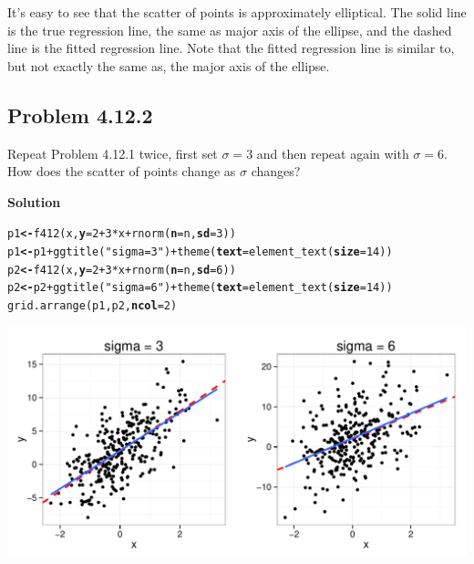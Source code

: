 \documentclass[12pt,oneside,a4paper]{article}\usepackage[]{graphicx}\usepackage[]{xcolor}
\makeatletter
\newcommand{\hlnum}[1]{\textcolor[rgb]{0,0,0}{#1}}%
\newcommand{\hlstr}[1]{\textcolor[rgb]{0,0,1}{#1}}%
\newcommand{\hlopt}[1]{\textcolor[rgb]{0,0,0}{#1}}%
\newcommand{\hlstd}[1]{\textcolor[rgb]{0,0,0}{#1}}%
\newcommand{\hlkwb}[1]{\textcolor[rgb]{0.498,0,0.333}{\textbf{#1}}}%
\newcommand{\hlkwc}[1]{\textcolor[rgb]{0.498,0,0.333}{\textbf{#1}}}%
\newcommand{\hlkwd}[1]{\textcolor[rgb]{0,0,0}{#1}}%
\newenvironment{kframe}{%
 \def\at@end@of@kframe{}%
 \ifinner\ifhmode%
  \def\at@end@of@kframe{\end{minipage}}%
  \begin{minipage}{\columnwidth}%
 \fi\fi%
 \def\FrameCommand##1{\hskip\@totalleftmargin \hskip-\fboxsep
 \colorbox{shadecolor}{##1}\hskip-\fboxsep
     \hskip-\linewidth \hskip-\@totalleftmargin \hskip\columnwidth}%
 \MakeFramed {\advance\hsize-\width
   \@totalleftmargin\z@ \linewidth\hsize
   \@setminipage}}%
 {\par\unskip\endMakeFramed%
 \at@end@of@kframe}
\newenvironment{knitrout}{}{} %
\newcommand{\subproblem}[1]
{
    \subsection*{Problem {#1}}
}
\newcommand{\solution}
{
    \vspace{15pt}
    \noindent\ignorespaces\textbf{\large Solution}
}
\makeatother
\begin{document}
It's easy to see that the scatter of points is approximately elliptical. The solid line is the true regression line, the same as major axis of the ellipse, and the dashed line is the fitted regression line. Note that the fitted regression line is similar to, but not exactly the same as, the major axis of the ellipse.

\subproblem{4.12.2}
Repeat Problem 4.12.1 twice, first set $\sigma = 3$ and then repeat again with $\sigma = 6$. How does the scatter of points change as $\sigma$ changes?

\solution
\begin{knitrout}
\color{fgcolor}\begin{kframe}
\begin{alltt}
\hlstd{p1} \hlkwb{<-} \hlkwd{f412}\hlstd{(x,} \hlkwc{y} \hlstd{=} \hlnum{2} \hlopt{+} \hlnum{3} \hlopt{*} \hlstd{x} \hlopt{+} \hlkwd{rnorm}\hlstd{(}\hlkwc{n} \hlstd{= n,} \hlkwc{sd} \hlstd{=} \hlnum{3}\hlstd{))}
\hlstd{p1} \hlkwb{<-} \hlstd{p1} \hlopt{+} \hlkwd{ggtitle}\hlstd{(}\hlstr{"sigma = 3"}\hlstd{)} \hlopt{+} \hlkwd{theme}\hlstd{(}\hlkwc{text} \hlstd{=} \hlkwd{element_text}\hlstd{(}\hlkwc{size} \hlstd{=} \hlnum{14}\hlstd{))}
\hlstd{p2} \hlkwb{<-} \hlkwd{f412}\hlstd{(x,} \hlkwc{y} \hlstd{=} \hlnum{2} \hlopt{+} \hlnum{3} \hlopt{*} \hlstd{x} \hlopt{+} \hlkwd{rnorm}\hlstd{(}\hlkwc{n} \hlstd{= n,} \hlkwc{sd} \hlstd{=} \hlnum{6}\hlstd{))}
\hlstd{p2} \hlkwb{<-} \hlstd{p2} \hlopt{+} \hlkwd{ggtitle}\hlstd{(}\hlstr{"sigma = 6"}\hlstd{)} \hlopt{+} \hlkwd{theme}\hlstd{(}\hlkwc{text} \hlstd{=} \hlkwd{element_text}\hlstd{(}\hlkwc{size} \hlstd{=} \hlnum{14}\hlstd{))}
\hlkwd{grid.arrange}\hlstd{(p1, p2,} \hlkwc{ncol} \hlstd{=} \hlnum{2}\hlstd{)}
\end{alltt}
\end{kframe}

{\centering \includegraphics[width=.9\linewidth]{figure/p4122} 

}



\end{knitrout}
\end{document}
